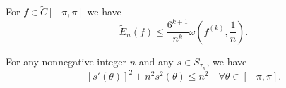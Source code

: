 \begin{theorem}\label{thm:jacksons_trigonometric_theorem}
  For \( f \in \tilde{C}[-\pi, \pi] \) we have
  \begin{equation*}
    \tilde{E}_n(f) \leq \frac {6^{k+1}} {n^k} \omega\left(f^{(k)}, \frac 1 n \right).
  \end{equation*}
\end{theorem}

\begin{theorem}\label{thm:szegos_trigonometric_inequality}
  For any nonnegative integer \( n \) and any \( s \in S_{\tau_n} \), we have
  \begin{equation}\label{eq:thm:szegos_trigonometric_inequality}
    [s'(\theta)]^2 + n^2 s^2 (\theta) \leq n^2 \quad\forall \theta \in [-\pi, \pi].
  \end{equation}
\end{theorem}
